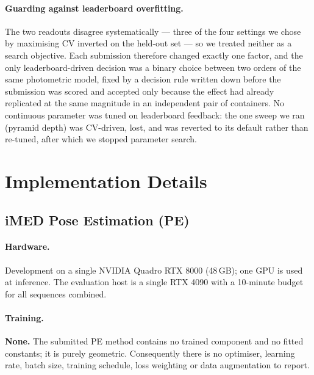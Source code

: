 \paragraph{Guarding against leaderboard overfitting.} The two readouts disagree systematically --- three of
the four settings we chose by maximising CV inverted on the held-out set --- so we treated neither as a
search objective. Each submission therefore changed exactly one factor, and the only leaderboard-driven
decision was a binary choice between two orders of the same photometric model, fixed by a decision rule
written down before the submission was scored and accepted only because the effect had already replicated
at the same magnitude in an independent pair of containers. No continuous parameter was tuned on
leaderboard feedback: the one sweep we ran (pyramid depth) was CV-driven, lost, and was reverted to its
default rather than re-tuned, after which we stopped parameter search.

\section{Implementation Details}

%

\subsection{iMED Pose Estimation (PE)}

\paragraph{Hardware.} Development on a single NVIDIA Quadro RTX 8000 (48\,GB); one GPU is used at
inference. The evaluation host is a single RTX 4090 with a 10-minute budget for all sequences combined.

\paragraph{Training.} \textbf{None.} The submitted PE method contains no trained component and no fitted
constants; it is purely geometric. Consequently there is no optimiser, learning rate, batch size, training
schedule, loss weighting or data augmentation to report.


